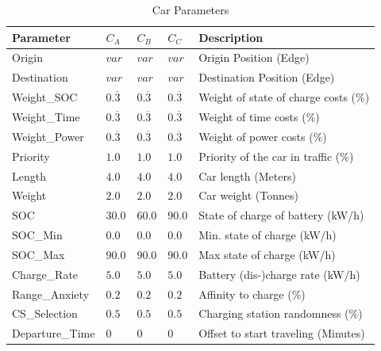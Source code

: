 \begin{table}[h]
	\renewcommand{\arraystretch}{1.3}
	\caption{Car Parameters}
	\centering
	\begin{tabular}{lllll}
		\hline
		\textbf{Parameter}          & \textbf{$C_{A}$} & \textbf{$C_{B}$}  & \textbf{$C_{C}$}           & \textbf{Description} \\ \hline
		Origin                      & $var$     & $var$ & $var$    & Origin Position (Edge)      \\
		Destination                 & $var$    & $var$  & $var$     & Destination Position (Edge) \\
		Weight\_SOC              & $0.\overline{3}$  & $0.\overline{3}$ & $0.\overline{3}$ & Weight of state of charge costs (\%)                   \\
		Weight\_Time              & $0.\overline{3}$ & $0.\overline{3}$ & $0.\overline{3}$ & Weight of time costs (\%)                     \\
		Weight\_Power             & $0.\overline{3}$ & $0.\overline{3}$ & $0.\overline{3}$ & Weight of power costs (\%)                      \\
		Priority                  & $1.0$ & $1.0$ & $1.0$ & Priority of the car in traffic (\%)                  \\
		Length                    & $4.0$ & $4.0$ & $4.0$ & Car length (Meters)            \\
		Weight                   & $2.0$ & $2.0$ & $2.0$ & Car weight  (Tonnes)                 \\
		SOC                      & $30.0$ & $60.0$ & $90.0$ & State of charge of battery (kW/h)                   \\
		SOC\_Min               & $0.0$ & $0.0$ & $0.0$ & Min. state of charge (kW/h)                     \\
		SOC\_Max              & $90.0$ & $90.0$ & $90.0$ & Max state of charge (kW/h)                      \\
		Charge\_Rate          & $5.0$ & $5.0$ & $5.0$ & Battery (dis-)charge rate (kW/h)                    \\
		Range\_Anxiety         & $0.2$ & $0.2$ & $0.2$ & Affinity to charge (\%)                     \\
		CS\_Selection		   & $0.5$ & $0.5$ & $0.5$ & Charging station randomness (\%)                    \\ 
		Departure\_Time 	& $0$ & $0$ & $0$ & Offset to start traveling (Minutes)                   \\ \hline
	\end{tabular}
\end{table}

